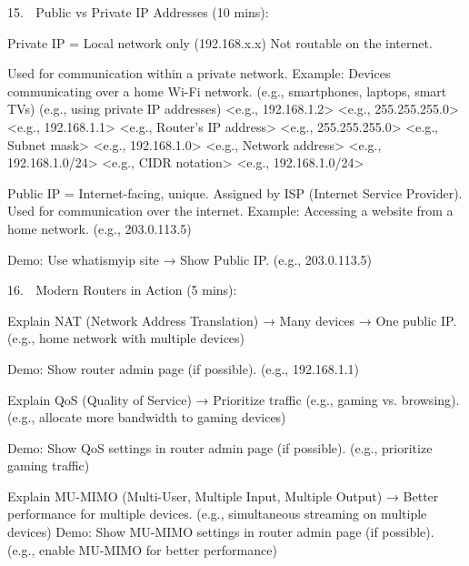     15. 🔐 Public vs Private IP Addresses (10 mins):

        Private IP = Local network only (192.168.x.x)
            Not routable on the internet.

            Used for communication within a private network.
                Example: Devices communicating over a home Wi-Fi network.
                (e.g., smartphones, laptops, smart TVs)
                    (e.g., using private IP addresses)
                        <e.g., 192.168.1.2>
                            <e.g., 255.255.255.0>
                                <e.g., 192.168.1.1>
                                    <e.g., Router's IP address>
                                        <e.g., 255.255.255.0>
                                            <e.g., Subnet mask>
                                            <e.g., 192.168.1.0>
                                                <e.g., Network address>
                                                <e.g., 192.168.1.0/24>
                                                <e.g., CIDR notation>
                                            <e.g., 192.168.1.0/24>
                

        Public IP = Internet-facing, unique.
            Assigned by ISP (Internet Service Provider).
            Used for communication over the internet.
                Example: Accessing a website from a home network.
                (e.g., 203.0.113.5)

        Demo: Use whatismyip site → Show Public IP.
            (e.g., 203.0.113.5)



    16. 📡 Modern Routers in Action (5 mins):

        Explain NAT (Network Address Translation) → Many devices → One public IP.
            (e.g., home network with multiple devices)

        Demo: Show router admin page (if possible).
            (e.g., 192.168.1.1)

        Explain QoS (Quality of Service) → Prioritize traffic (e.g., gaming vs. browsing).
            (e.g., allocate more bandwidth to gaming devices)

        Demo: Show QoS settings in router admin page (if possible).
            (e.g., prioritize gaming traffic)

        Explain MU-MIMO (Multi-User, Multiple Input, Multiple Output) → Better performance for multiple devices.
            (e.g., simultaneous streaming on multiple devices)
        Demo: Show MU-MIMO settings in router admin page (if possible).
            (e.g., enable MU-MIMO for better performance)




